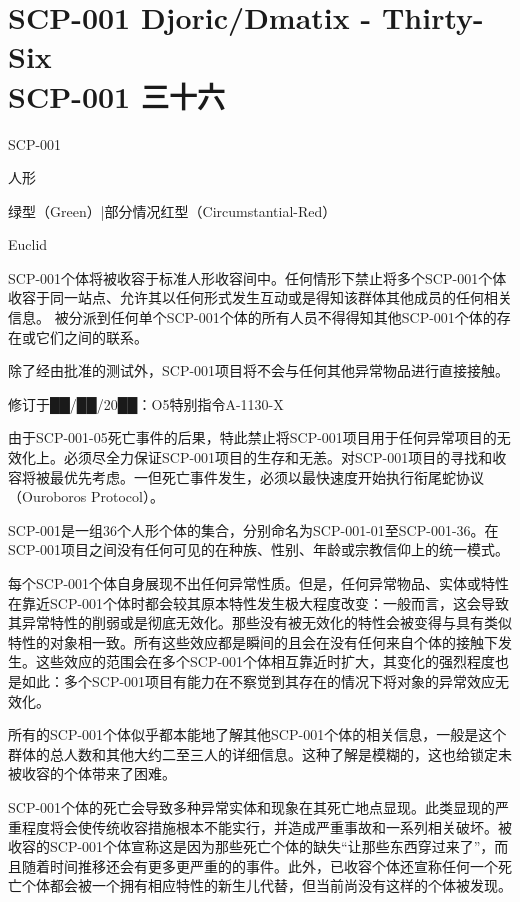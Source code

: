 \chapter[SCP-001 三十六]{
	SCP-001 Djoric/Dmatix - Thirty-Six \\
	SCP-001 三十六
}

\label{chap:SCP-001.thirty.six}

SCP-001

人形

绿型（Green）|部分情况红型（Circumstantial-Red）

Euclid

SCP-001个体将被收容于标准人形收容间中。任何情形下禁止将多个SCP-001个体收容于同一站点、允许其以任何形式发生互动或是得知该群体其他成员的任何相关信息。 被分派到任何单个SCP-001个体的所有人员不得得知其他SCP-001个体的存在或它们之间的联系。

除了经由批准的测试外，SCP-001项目将不会与任何其他异常物品进行直接接触。

修订于██\slash ██\slash 20██：O5特别指令A-1130-X

由于SCP-001-05死亡事件的后果，特此禁止将SCP-001项目用于任何异常项目的无效化上。必须尽全力保证SCP-001项目的生存和无恙。对SCP-001项目的寻找和收容将被最优先考虑。一但死亡事件发生，必须以最快速度开始执行衔尾蛇协议（Ouroboros Protocol）。

SCP-001是一组36个人形个体的集合，分别命名为SCP-001-01至SCP-001-36。在SCP-001项目之间没有任何可见的在种族、性别、年龄或宗教信仰上的统一模式。

每个SCP-001个体自身展现不出任何异常性质。但是，任何异常物品、实体或特性在靠近SCP-001个体时都会较其原本特性发生极大程度改变：一般而言，这会导致其异常特性的削弱或是彻底无效化。那些没有被无效化的特性会被变得与具有类似特性的对象相一致。所有这些效应都是瞬间的且会在没有任何来自个体的接触下发生。这些效应的范围会在多个SCP-001个体相互靠近时扩大，其变化的强烈程度也是如此：多个SCP-001项目有能力在不察觉到其存在的情况下将对象的异常效应无效化。

所有的SCP-001个体似乎都本能地了解其他SCP-001个体的相关信息，一般是这个群体的总人数和其他大约二至三人的详细信息。这种了解是模糊的，这也给锁定未被收容的个体带来了困难。

SCP-001个体的死亡会导致多种异常实体和现象在其死亡地点显现。此类显现的严重程度将会使传统收容措施根本不能实行，并造成严重事故和一系列相关破坏。被收容的SCP-001个体宣称这是因为那些死亡个体的缺失“让那些东西穿过来了”，而且随着时间推移还会有更多更严重的的事件。此外，已收容个体还宣称任何一个死亡个体都会被一个拥有相应特性的新生儿代替，但当前尚没有这样的个体被发现。

